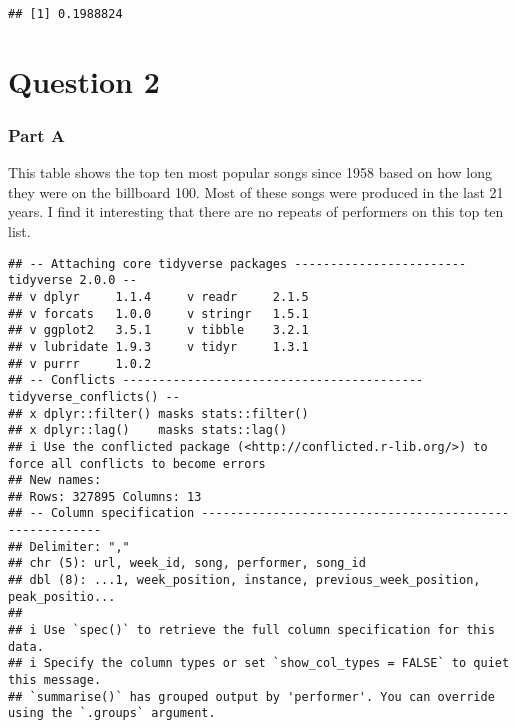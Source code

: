 \documentclass[
]{article}
\begin{document}
\begin{verbatim}
## [1] 0.1988824
\end{verbatim}

\section{Question 2}\label{question-2}

\subsubsection{Part A}\label{part-a}

This table shows the top ten most popular songs since 1958 based on how
long they were on the billboard 100. Most of these songs were produced
in the last 21 years. I find it interesting that there are no repeats of
performers on this top ten list.

\begin{verbatim}
## -- Attaching core tidyverse packages ------------------------ tidyverse 2.0.0 --
## v dplyr     1.1.4     v readr     2.1.5
## v forcats   1.0.0     v stringr   1.5.1
## v ggplot2   3.5.1     v tibble    3.2.1
## v lubridate 1.9.3     v tidyr     1.3.1
## v purrr     1.0.2     
## -- Conflicts ------------------------------------------ tidyverse_conflicts() --
## x dplyr::filter() masks stats::filter()
## x dplyr::lag()    masks stats::lag()
## i Use the conflicted package (<http://conflicted.r-lib.org/>) to force all conflicts to become errors
## New names:
## Rows: 327895 Columns: 13
## -- Column specification --------------------------------------------------------
## Delimiter: ","
## chr (5): url, week_id, song, performer, song_id
## dbl (8): ...1, week_position, instance, previous_week_position, peak_positio...
## 
## i Use `spec()` to retrieve the full column specification for this data.
## i Specify the column types or set `show_col_types = FALSE` to quiet this message.
## `summarise()` has grouped output by 'performer'. You can override using the `.groups` argument.
\end{verbatim}
\end{document}
